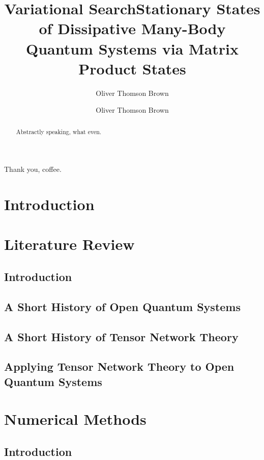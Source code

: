 \documentclass[a4paper,twoside,12pt]{hwthesis}
\author{Oliver Thomson Brown}
\title{Variational Search}
\author{Oliver Thomson Brown}
\title{Stationary States of Dissipative Many-Body Quantum Systems via Matrix Product States}
\begin{document}
\maketitle


\begin{acknowledgements}
Thank you, coffee.
\end{acknowledgements}

\begin{abstract}
Abstractly speaking, what even.
\end{abstract}

\tableofcontents

\chapter{Introduction}
\setcounter{page}{1}

\chapter{Literature Review}

\section{Introduction}

\section{A Short History of Open Quantum Systems}

\section{A Short History of Tensor Network Theory}

\section{Applying Tensor Network Theory to Open Quantum Systems}

\chapter{Numerical Methods}

\section{Introduction}
\end{document}
